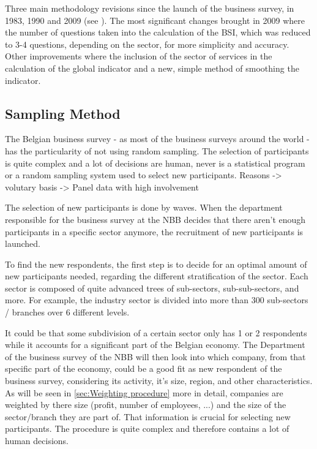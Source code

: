 \documentclass[12pt,a4paper,oneside]{book}
\begin{document}
Three main methodology revisions since the launch of the business survey, in 1983, 1990 and 2009 (see \cite{de_greef_national_2009}).
The most significant changes brought in 2009 where the number of questions taken into the calculation of the BSI, which was reduced to 3-4 questions, depending on the sector, for more simplicity and accuracy.
Other improvements where the inclusion of the sector of services in the calculation of the global indicator and a new, simple method of smoothing the indicator.

\subsection{Sampling Method}
\label{sec:Recruitment of participants}

The Belgian business survey - as most of the business surveys around the world - has the particularity of not using random sampling. 
The selection of participants is quite complex and a lot of decisions are human, never is a statistical program or a random sampling system used to select new participants.
Reasons 
-> volutary basis
-> Panel data with high involvement


The selection of new participants is done by waves. When the department responsible for the business survey at the NBB decides that there aren't enough participants in a specific sector anymore, the recruitment of new participants is launched.

To find the new respondents, the first step is to decide for an optimal amount of new participants needed, regarding the different stratification of the sector.
Each sector is composed of quite advanced trees of sub-sectors, sub-sub-sectors,  and more. For example, the industry sector is divided into more than 300 sub-sectors / branches over 6 different levels. 

It could be that some subdivision of a certain sector only has 1 or 2 respondents while it accounts for a significant part of the Belgian economy. The Department of the business survey of the NBB will then look into which company, from that specific part of the economy, could be a good fit as new respondent of the business survey, considering its activity, it's size, region, and other characteristics.
As will be seen in \autoref{sec:Weighting procedure} more in detail, companies are weighted by there size (profit, number of employees, ...) and the size of the sector/branch they are part of. That information is crucial for selecting new participants.
The procedure is quite complex and therefore contains a lot of human decisions.
 
\end{document}
